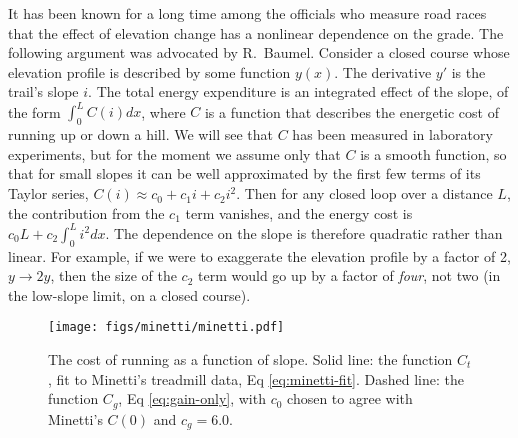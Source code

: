 \documentclass[10pt,letterpaper]{article}
\begin{document}
It has been known for a long
time among the officials who measure road races that the effect
of elevation change has a nonlinear dependence on the grade. The following argument 
was advocated by R.~Baumel.\cite{baumel}
Consider a closed course whose elevation
profile is described by some function $y(x)$. The derivative $y'$ is the trail's slope $i$.
The total energy expenditure is an integrated effect of the slope, of the form $\int_0^L C(i)dx$,
where $C$ is a function that describes the energetic cost of running up or down a hill.
We will see that $C$ has been measured in laboratory experiments, but for the moment we assume
only that $C$ is a smooth function, so that for small slopes it can be well approximated by the first few terms
of its Taylor series, $C(i)\approx c_0+c_1 i+c_2 i^2$. Then for any closed loop over a distance $L$,
the contribution from the $c_1$ term vanishes, and the energy cost is $c_0 L+c_2 \int_0^L i^2 dx$.
The dependence on the slope is therefore quadratic rather than linear. For example, if we were to exaggerate the
elevation profile by a factor of 2, $y\rightarrow 2y$, then the size of the $c_2$ term would go up by
a factor of \emph{four}, not two (in the low-slope limit, on a closed course).

\begin{figure}[h]
\texttt{[image: figs/minetti/minetti.pdf]}
\centering
\caption{The cost of running as a function of slope. Solid line: the function $C_t$, fit to Minetti's treadmill data, Eq \ref{eq:minetti-fit}. Dashed line:
the function $C_g$, Eq \ref{eq:gain-only}, with $c_0$ chosen to agree with Minetti's $C(0)$ and $c_g=6.0$.}
\label{fig:minetti}
\end{figure}
\end{document}
